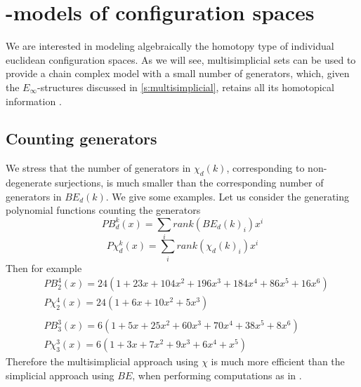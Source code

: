 
\section{\pdfEinfty-models of configuration spaces}


We are interested in modeling algebraically the homotopy type of individual euclidean configuration spaces.
As we will see, multisimplicial sets can be used to provide a chain complex model with a small number of generators, which, given the $E_\infty$-structures discussed in \cref{s:multisimplicial}, retains all its homotopical information .





\subsection{Counting generators}

We stress that the number of generators in $\chi_d(k)$, corresponding to non-degenerate surjections, is much smaller than the corresponding number of generators in $BE_d(k)$.
We give some examples.
Let us consider the generating polynomial functions counting the generators
$$PB_d^k(x) = \sum_i rank(BE_d(k)_i) x^i $$ $$P\chi_d^k(x)=
\sum_i rank(\chi_d(k)_i) x^i$$
Then for example
\begin{align*}
	& PB_2^4(x)=24(1+23x+104x^2+196x^3+184x^4+86x^5+16x^6)\\
	& P\chi_2^4(x)=24(1+6x+10x^2+5x^3) \\
	& \\
	& PB_3^3(x) = 6(1+5x+25x^2+60x^3+70x^4+38x^5+8x^6 ) \\
	&  P\chi_3^3(x)= 6(1+3x+7x^2+9x^3+6x^4+x^5)
\end{align*}
Therefore the multisimplicial approach using $\chi$ is much more efficient than the simplicial
approach using $BE$, when performing computations as in \cite{formality}.

